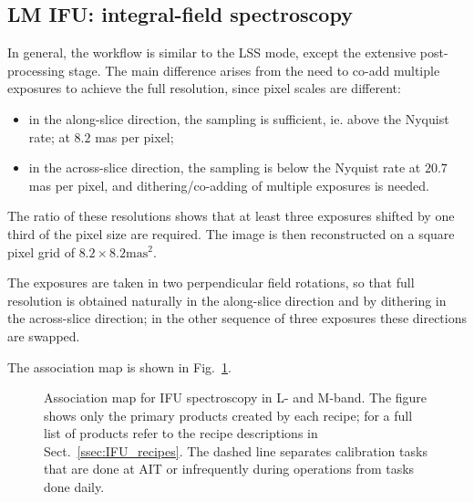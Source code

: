 \subsection{LM IFU: integral-field spectroscopy}
\label{ssec:overview_ifu}

In general, the workflow is similar to the \ac{LSS} mode,
except the extensive post-processing stage.
The main difference arises from the need to co-add multiple exposures
to achieve the full resolution, since pixel scales are different:
\begin{itemize}
    \item in the along-slice direction, the sampling is sufficient, ie. above the Nyquist rate;
        at $8.2$ mas per pixel;
    \item in the across-slice direction, the sampling is below the Nyquist rate at
        $20.7$ mas per pixel, and dithering/co-adding of multiple exposures is needed.
\end{itemize}

The ratio of these resolutions shows that at least three exposures shifted by one third of the
pixel size are required. The image is then reconstructed on a square pixel grid of
$8.2 \times 8.2 \text{mas}^2$.

The exposures are taken in two perpendicular field rotations,
so that full resolution is obtained naturally in the along-slice direction
and by dithering in the across-slice direction; in the other sequence of three exposures
these directions are swapped.

The association map is shown in Fig.~\ref{Fig:IfuAssomap}.

\begin{landscape}
\begin{figure}[ht]
  \centering
  \resizebox{\linewidth}{!}{}
  \caption[Reduction cascade and association map for IFU spectroscopy]{%
    Association map for \ac{IFU} spectroscopy in L- and M-band. The
    figure shows only the primary products created by each recipe; for
    a full list of products refer to the recipe descriptions in
    Sect.~\ref{ssec:IFU_recipes}. The dashed line separates
    calibration tasks that are done at AIT or infrequently during
    operations from tasks done daily.}
  \label{Fig:IfuAssomap}
\end{figure}
\end{landscape}
\restoregeometry




